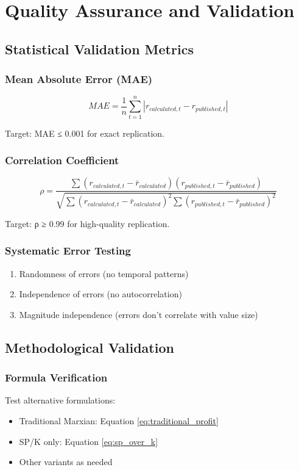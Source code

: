 \documentclass[12pt,a4paper]{article}
\begin{document}
\section{Quality Assurance and Validation}

\subsection{Statistical Validation Metrics}

\subsubsection{Mean Absolute Error (MAE)}
\begin{equation}
MAE = \frac{1}{n} \sum_{t=1}^n |r_{calculated,t} - r_{published,t}|
\label{eq:mae}
\end{equation}

Target: MAE ≤ 0.001 for exact replication.

\subsubsection{Correlation Coefficient}
\begin{equation}
\rho = \frac{\sum (r_{calculated,t} - \bar{r}_{calculated})(r_{published,t} - \bar{r}_{published})}{\sqrt{\sum (r_{calculated,t} - \bar{r}_{calculated})^2 \sum (r_{published,t} - \bar{r}_{published})^2}}
\label{eq:correlation}
\end{equation}

Target: ρ ≥ 0.99 for high-quality replication.

\subsubsection{Systematic Error Testing}
\begin{enumerate}
    \item Randomness of errors (no temporal patterns)
    \item Independence of errors (no autocorrelation)
    \item Magnitude independence (errors don't correlate with value size)
\end{enumerate}

\subsection{Methodological Validation}

\subsubsection{Formula Verification}
Test alternative formulations:
\begin{itemize}
    \item Traditional Marxian: Equation \ref{eq:traditional_profit}
    \item SP/K only: Equation \ref{eq:sp_over_k}
    \item Other variants as needed
\end{itemize}
\end{document}
